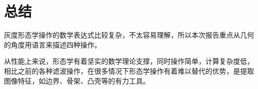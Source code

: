 \documentclass[UTF8]{ctexart}
\begin{document}
%
%
%
%
%
%
%
                

        

            


	\section{总结}
  
        \indent 灰度形态学操作的数学表达式比较复杂，不太容易理解，所以本次报告重点从几何的角度用语言来描述四种操作。
        
        \indent 从性能上来说，形态学有着坚实的数学理论支撑，同时操作简单，计算复杂度低，相比之前的各种滤波操作，在很多情况下形态学操作有着难以替代的优势，是提取图像特征，如边界、骨架、凸壳等的有力工具。
		

		
	
	
%
%

\end{document}
